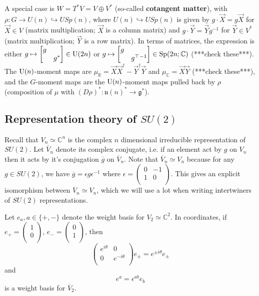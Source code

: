A special case is $W=T^*V=V\oplus V^*$ (so-called \textbf{cotangent matter}), with $\rho:G\to U(n)\hookrightarrow USp(n)$, where $ U(n)\hookrightarrow USp(n)$ is given by $g\cdot\vec X=g\vec X$ for $\vec X\in V$ (matrix multiplication; $\vec X$ is a column matrix) and $g\cdot\vec Y=\vec Yg^{-1}$ for $\vec Y\in V^*$ (matrix multiplication; $\vec Y$ is a row matrix). In terms of matrices, the expression is either $g\mapsto\begin{bmatrix}g&\\&g^*\end{bmatrix}\in\mathrm{U}(2n)$ or $g\mapsto\begin{bmatrix}g&\\&g^\top{}^{-1}\end{bmatrix}\in\mathrm{Sp}(2n;\mathbb C)$ (***check these***). The $\mathrm{U}(n)$-moment maps are $\mu_\mathbb R=\vec X\vec X^\dagger-\vec Y^\dagger\vec Y$ and $\mu_\mathbb C=\vec X\vec Y$ (***check these***), and the $G$-moment maps are the $\mathrm{U}(n)$-moment maps pulled back by $\rho$ (composition of $\mu$ with $(D\rho)^*:\mathfrak u(n)^*\to\mathfrak g^*$).


\subsection{Representation theory of $SU(2)$}

Recall that $V_n \simeq \mathbb{C}^n$ is the complex $n$ dimensional irreducible 
representation of $SU(2)$. Let $\overline{V}_n$ denote its complex conjugate, i.e. if an element 
act by $g$ on $V_n$ then it acts by it's conjugation $\overline{g}$ on $\overline{V}_n$.
Note that $\overline{V}_n \simeq V_n$ because for any $g \in SU(2)$, we have 
$\overline{g} = \epsilon g \epsilon ^{-1}$ where $\epsilon = \begin{pmatrix}
0 & -1 \\
1 & 0 \\
\end{pmatrix}$. This gives an explicit isomorphism between $\overline{V}_n \simeq V_n$,
which we will use a lot when writing intertwiners of $SU(2)$ representations.

Let $e_a, a \in \{+, -\}$ denote the weight basis for $V_2 \simeq \mathbb{C}^{2}$.
In coordinates, if $e_+ = \begin{pmatrix}
1 \\
0 \\
\end{pmatrix} $, $e_- = \begin{pmatrix}
0 \\
1 \\
\end{pmatrix}$, then
\[ 
    \begin{pmatrix}
    e ^{i \theta }& 0 \\
    0 & e ^{-i \theta } \\
    \end{pmatrix} e _{\pm} = e ^{\pm i \theta }e _{\pm}
\]
and
\[ 
    e ^{a} = \epsilon ^{ab}e_b
\]
is a weight basis for $\overline{V}_2$.

